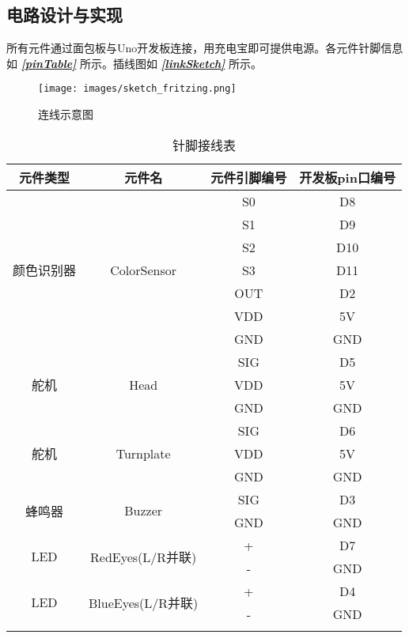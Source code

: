\documentclass[a4paper,12pt]{ctexart}
\newcommand{\aref}[1]{\textbf{\textit{\autoref{#1}}}}
\begin{document}
		\subsection{电路设计与实现}
			所有元件通过面包板与Uno开发板连接，用充电宝即可提供电源。各元件针脚信息如 \aref{pinTable} 所示。插线图如 \aref{linkSketch} 所示。
			
			\begin{figure}[!ht]
			\centering
			\texttt{[image: images/sketch\_fritzing.png]}
			\caption{连线示意图}\label{linkSketch}
			\end{figure}
			
			\begin{longtable}[!ht]{|c|c|c|c|}
				\hline
				\textbf{元件类型} & \textbf{元件名} & \textbf{元件引脚编号} & \textbf{开发板pin口编号}\\ \hline
				\multirow{7}{*}{颜色识别器} &
				\multirow{7}{*}{ColorSensor} &
				S0&D8\\ \cline{3-4}
				 & & S1 & D9\\ \cline{3-4}
				 & & S2 & D10\\ \cline{3-4}
				 & & S3 & D11\\  \cline{3-4}
				 & & OUT & D2\\ \cline{3-4}
				 & & VDD & 5V\\ \cline{3-4}
				 & & GND & GND\\ \hline
				 \multirow{3}{*}{舵机} &
				 \multirow{3}{*}{Head} &
				 SIG & D5\\ \cline{3-4}
				 & & VDD & 5V\\ \cline{3-4}
				 & & GND & GND\\ \hline
				 \multirow{3}{*}{舵机} &
				 \multirow{3}{*}{Turnplate} &
				 SIG & D6\\ \cline{3-4}
				 & & VDD & 5V\\ \cline{3-4}
				 & & GND & GND\\ \hline
				 \multirow{2}{*}{蜂鸣器} &
				 \multirow{2}{*}{Buzzer} &
				 SIG & D3\\ \cline{3-4}
				 & & GND & GND\\ \hline
				 \multirow{2}{*}{LED} &
				 \multirow{2}{*}{RedEyes(L/R并联)} &
				 + & D7\\ \cline{3-4}
				 & & - & GND\\ \hline
				 \multirow{2}{*}{LED} &
				 \multirow{2}{*}{BlueEyes(L/R并联)} &
				 + & D4\\ \cline{3-4}
				 & & - & GND\\ \hline
				 
				 
			\caption{针脚接线表}\label{pinTable}
			\end{longtable}
\end{document}
